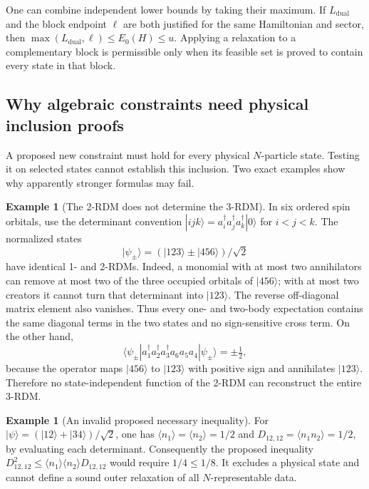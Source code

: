 \documentclass[11pt,a4paper]{article}
\theoremstyle{plain}
\theoremstyle{definition}
\newtheorem{example}[theorem]{Example}
\theoremstyle{remark}
\begin{document}
One can combine independent lower bounds by taking their maximum. If
$L_{\mathrm{dual}}$ and the block endpoint $\ell$ are both justified for
the same Hamiltonian and sector, then
$\max(L_{\mathrm{dual}},\ell)\le E_0(H)\le u$. Applying a relaxation
to a complementary block is permissible only when its feasible set is proved
to contain every state in that block.

\subsection{Why algebraic constraints need physical inclusion proofs}
A proposed new constraint must hold for every physical $N$-particle state.
Testing it on selected states cannot establish this inclusion. Two exact
examples show why apparently stronger formulas may fail.

\begin{example}[The 2-RDM does not determine the 3-RDM]
\label{ex:three-rdm}
In six ordered spin orbitals, use the determinant convention
$|ijk\rangle=a_i^\dagger a_j^\dagger a_k^\dagger|0\rangle$ for
$i<j<k$. The normalized states
\[
 |\psi_\pm\rangle=(|123\rangle\pm|456\rangle)/\sqrt2
\]
have identical 1- and 2-RDMs. Indeed, a monomial with at most two annihilators
can remove at most two of the three occupied orbitals of $|456\rangle$;
with at most two creators it cannot turn that determinant into $|123\rangle$.
The reverse off-diagonal matrix element also vanishes. Thus every one- and
two-body expectation contains the same diagonal terms in the two states and
no sign-sensitive cross term. On the other hand,
\[
 \langle\psi_\pm|
 a_1^\dagger a_2^\dagger a_3^\dagger a_6a_5a_4
 |\psi_\pm\rangle=\pm\tfrac12,
\]
because the operator maps $|456\rangle$ to $|123\rangle$ with positive
sign and annihilates $|123\rangle$. Therefore no state-independent function
of the 2-RDM can reconstruct the entire 3-RDM.
\end{example}

\begin{example}[An invalid proposed necessary inequality]
For $|\psi\rangle=(|12\rangle+|34\rangle)/\sqrt2$, one has
$\langle n_1\rangle=\langle n_2\rangle=1/2$ and
$D_{12,12}=\langle n_1n_2\rangle=1/2$, by evaluating each determinant.
Consequently the proposed inequality
$D_{12,12}^2\le\langle n_1\rangle\langle n_2\rangle D_{12,12}$
would require $1/4\le1/8$. It excludes a physical state and cannot define a
sound outer relaxation of all $N$-representable data.
\end{example}
\end{document}
